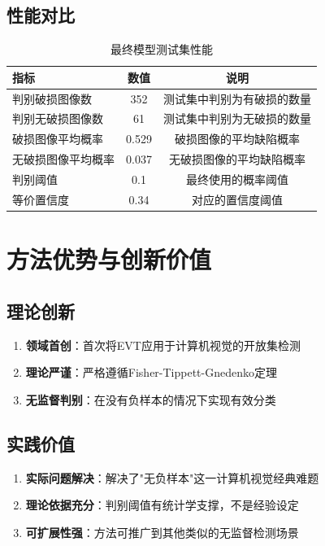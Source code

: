 \documentclass[12pt,a4paper]{ctexart}
\theoremstyle{cumcm}
\begin{document}
\subsection{性能对比}

\begin{table}[H]
\centering
{}
\caption{最终模型测试集性能}
\begin{tabular}{lcc}
\toprule
\textbf{指标} & \textbf{数值} & \textbf{说明} \\
\midrule
判别破损图像数 & 352 & 测试集中判别为有破损的数量 \\
判别无破损图像数 & 61 & 测试集中判别为无破损的数量 \\
破损图像平均概率 & 0.529 & 破损图像的平均缺陷概率 \\
无破损图像平均概率 & 0.037 & 无破损图像的平均缺陷概率 \\
判别阈值 & 0.1 & 最终使用的概率阈值 \\
等价置信度 & 0.34 & 对应的置信度阈值 \\
\bottomrule
\end{tabular}
\end{table}

\section{方法优势与创新价值}

\subsection{理论创新}

\begin{enumerate}[leftmargin=2.2em,itemsep=2pt]
\item \textbf{领域首创}：首次将EVT应用于计算机视觉的开放集检测
\item \textbf{理论严谨}：严格遵循Fisher-Tippett-Gnedenko定理
\item \textbf{无监督判别}：在没有负样本的情况下实现有效分类
\end{enumerate}

\subsection{实践价值}

\begin{enumerate}[leftmargin=2.2em,itemsep=2pt]
\item \textbf{实际问题解决}：解决了"无负样本"这一计算机视觉经典难题
\item \textbf{理论依据充分}：判别阈值有统计学支撑，不是经验设定
\item \textbf{可扩展性强}：方法可推广到其他类似的无监督检测场景
\end{enumerate}
\end{document}
